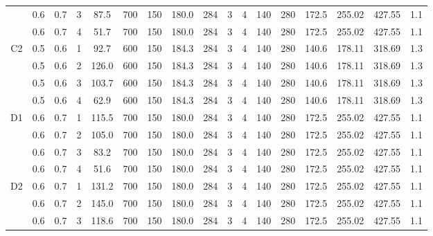 \begin{table}[H]
{\begin{tabular}{|c|c|c|r|c|c|c|c|c|c|c|c|c|c|c|c|c|}
\cline{2-17}          & 0.6   & 0.7   & 3     & 87.5  & 700   & 150   & 180.0 & 284   & 3     & 4     & 140   & 280   & 172.5 & 255.02 & 427.55 & 1.1 \bigstrut\\
\cline{2-17}          & 0.6   & 0.7   & 4     & 51.7  & 700   & 150   & 180.0 & 284   & 3     & 4     & 140   & 280   & 172.5 & 255.02 & 427.55 & 1.1 \bigstrut\\
    \hline
    \multirow{4}[8]{*}{C2} & 0.5   & 0.6   & 1     & 92.7  & 600   & 150   & 184.3 & 284   & 3     & 4     & 140   & 280   & 140.6 & 178.11 & 318.69 & 1.3 \bigstrut\\
\cline{2-17}          & 0.5   & 0.6   & 2     & 126.0 & 600   & 150   & 184.3 & 284   & 3     & 4     & 140   & 280   & 140.6 & 178.11 & 318.69 & 1.3 \bigstrut\\
\cline{2-17}          & 0.5   & 0.6   & 3     & 103.7 & 600   & 150   & 184.3 & 284   & 3     & 4     & 140   & 280   & 140.6 & 178.11 & 318.69 & 1.3 \bigstrut\\
\cline{2-17}          & 0.5   & 0.6   & 4     & 62.9  & 600   & 150   & 184.3 & 284   & 3     & 4     & 140   & 280   & 140.6 & 178.11 & 318.69 & 1.3 \bigstrut\\
    \hline
    \multirow{4}[8]{*}{D1} & 0.6   & 0.7   & 1     & 115.5 & 700   & 150   & 180.0 & 284   & 3     & 4     & 140   & 280   & 172.5 & 255.02 & 427.55 & 1.1 \bigstrut\\
\cline{2-17}          & 0.6   & 0.7   & 2     & 105.0 & 700   & 150   & 180.0 & 284   & 3     & 4     & 140   & 280   & 172.5 & 255.02 & 427.55 & 1.1 \bigstrut\\
\cline{2-17}          & 0.6   & 0.7   & 3     & 83.2  & 700   & 150   & 180.0 & 284   & 3     & 4     & 140   & 280   & 172.5 & 255.02 & 427.55 & 1.1 \bigstrut\\
\cline{2-17}          & 0.6   & 0.7   & 4     & 51.6  & 700   & 150   & 180.0 & 284   & 3     & 4     & 140   & 280   & 172.5 & 255.02 & 427.55 & 1.1 \bigstrut\\
    \hline
    \multirow{4}[8]{*}{D2} & 0.6   & 0.7   & 1     & 131.2 & 700   & 150   & 180.0 & 284   & 3     & 4     & 140   & 280   & 172.5 & 255.02 & 427.55 & 1.1 \bigstrut\\
\cline{2-17}          & 0.6   & 0.7   & 2     & 145.0 & 700   & 150   & 180.0 & 284   & 3     & 4     & 140   & 280   & 172.5 & 255.02 & 427.55 & 1.1 \bigstrut\\
\cline{2-17}          & 0.6   & 0.7   & 3     & 118.6 & 700   & 150   & 180.0 & 284   & 3     & 4     & 140   & 280   & 172.5 & 255.02 & 427.55 & 1.1 \bigstrut\\

\end{tabular}}
\end{table}
